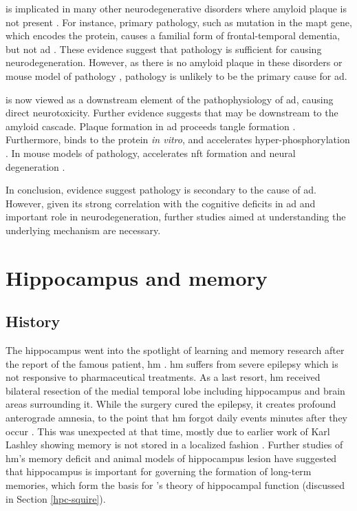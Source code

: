 \atau{} is implicated in many other neurodegenerative disorders where amyloid plaque is not present \citep[e.g.][]{williams09, mckee16}. For instance, primary \atau{} pathology, such as mutation in the \gls{mapt} gene, which encodes the \atau{} protein, causes a familial form of frontal-temporal dementia, but not \gls{ad} \citep{hutton98, poorkaj98}. These evidence suggest that \atau{} pathology is sufficient for causing neurodegeneration. However, as there is no amyloid plaque in these disorders or mouse model of \atau{} pathology \citep{gotz04}, \atau{} pathology is unlikely to be the primary cause for \gls{ad}.

\atau{} is now viewed as a downstream element of the pathophysiology of \gls{ad}, causing direct neurotoxicity. Further evidence suggests that \atau{} may be downstream to the amyloid cascade. Plaque formation in \gls{ad} proceeds tangle formation \citep{price99}. Furthermore, \abeta{} binds to the \atau{} protein \textit{in vitro}, and accelerates \atau{} hyper-phosphorylation \citep{guo06, zempel10}. In mouse models of \atau{} pathology, \abeta{} accelerates \gls{nft} formation and neural degeneration \citep{lewis01, terwel08}.

In conclusion, evidence suggest \atau{} pathology is secondary to the cause of \gls{ad}. However, given its strong correlation with the cognitive deficits in \gls{ad} and important role in neurodegeneration, further studies aimed at understanding the underlying mechanism are necessary. 

\section{Hippocampus and memory}
\subsection{History}
The hippocampus went into the spotlight of learning and memory research after the report of the famous patient, \gls{hm} \citep{scoville57, squire09}. \Gls{hm} suffers from severe epilepsy which is not responsive to pharmaceutical treatments. As a last resort, \gls{hm} received bilateral resection of the medial temporal lobe including hippocampus and brain areas surrounding it. While the surgery cured the epilepsy, it creates profound anterograde amnesia, to the point that \gls{hm} forgot daily events minutes after they occur \citep{scoville57, squire09}. This was unexpected at that time, mostly due to earlier work of Karl Lashley showing memory is not stored in a localized fashion \citep{bruce01}. Further studies of \gls{hm}'s memory deficit and animal models of hippocampus lesion have suggested that hippocampus is important for governing the formation of long-term memories, which form the basis for \citet{squire91}'s theory of hippocampal function (discussed in Section \ref{hpc-squire}).

